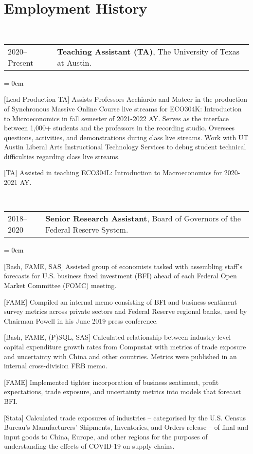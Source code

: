 \documentclass[a4paper, 11pt]{article}
\begin{document}
  \section{Employment History}
  ~\begin{tabular}{ll}
    2020--Present & \textbf{Teaching Assistant (TA)}, The University of Texas at Austin.
  \end{tabular}
  \begin{compactitem}\parskip = 0cm
    \item {[Lead Production TA]} Assists Professors Acchiardo and Mateer in the production of Synchronous Massive Online Course live streams for ECO304K: Introduction to Microeconomics in fall semester of 2021-2022 AY. Serves as the interface between 1,000+ students and the professors in the recording studio. Oversees questions, activities, and demonstrations during class live streams. Work with UT Austin Liberal Arts Instructional Technology Services to debug student technical difficulties regarding class live streams.
    \item {[TA]} Assisted in teaching ECO304L: Introduction to Macroeconomics for 2020-2021 AY.
  \end{compactitem}
  \vspace*{1em}
      
  ~\begin{tabular}{ll}
    2018--2020 & \textbf{Senior Research Assistant}, Board of Governors of the Federal Reserve System.
  \end{tabular}
  \begin{compactitem}\parskip = 0cm
    \item {[Bash, FAME, SAS]} Assisted group of economists tasked with assembling staff's forecasts for U.S. business fixed investment (BFI) ahead of each Federal Open Market Committee (FOMC) meeting.
    \item {[FAME]} Compiled an internal memo consisting of BFI and business sentiment survey metrics across private sectors and Federal Reserve regional banks, used by Chairman Powell in his June 2019 press conference.
    \item {[Bash, FAME, (P)SQL, SAS]} Calculated relationship between industry-level capital expenditure growth rates from Compustat with metrics of trade exposure and uncertainty with China and other countries. Metrics were published in an internal cross-division FRB memo.
    \item {[FAME]} Implemented tighter incorporation of business sentiment, profit expectations, trade exposure, and uncertainty metrics into models that forecast BFI.
    \item {[Stata]} Calculated trade exposures of industries -- categorised by the U.S. Census Bureau's Manufacturers' Shipments, Inventories, and Orders release -- of final and input goods to China, Europe, and other regions for the purposes of understanding the effects of COVID-19 on supply chains.
  \end{compactitem}
  \vspace*{1em}
      
\end{document}
